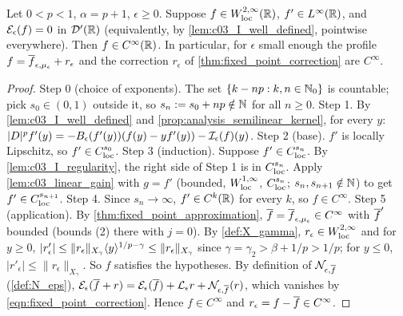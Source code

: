 \begin{theorem}
  \label{thm:fixed_point_smoothness}
  Let $0<p<1$, $\alpha=p+1$, $\epsilon\ge0$. Suppose $f\in W^{2,\infty}_{\textup{loc}}(\mathbb{R})$, $f'\in L^\infty(\mathbb{R})$, and $\mathcal{E}_\epsilon(f)=0$ in $\mathcal{D}'(\mathbb{R})$
  (equivalently, by \cref{lem:c03_I_well_defined}, pointwise everywhere). Then $f\in C^\infty(\mathbb{R})$.
  In particular, for $\epsilon$ small enough the profile $f=\overline{f}_{\epsilon,\mu_\epsilon}+r_\epsilon$ and the correction $r_\epsilon$ of \cref{thm:fixed_point_correction} are $C^\infty$.
\end{theorem}
\begin{proof}
  Step 0 (choice of exponents). The set $\{k-np:k,n\in\mathbb{N}_0\}$ is countable; pick $s_0\in(0,1)$ outside it, so $s_n:=s_0+np\notin\mathbb{N}$ for all $n\ge0$.
  Step 1. By \cref{lem:c03_I_well_defined} and \cref{prop:analysis_semilinear_kernel}, for every $y$:
  $|D|^pf'(y)=-B_\epsilon(f'(y))(f(y)-yf'(y))-\mathcal{I}_\epsilon(f)(y)$.
  Step 2 (base). $f'$ is locally Lipschitz, so $f'\in C^{s_0}_{\textup{loc}}$.
  Step 3 (induction). Suppose $f'\in C^{s_n}_{\textup{loc}}$. By \cref{lem:c03_I_regularity}, the right side of Step 1 is in $C^{s_n}_{\textup{loc}}$. Apply \cref{lem:c03_linear_gain} with $g=f'$ (bounded, $W^{1,\infty}_{\textup{loc}}$, $C^{s_n}_{\textup{loc}}$; $s_n,s_{n+1}\notin\mathbb{N}$) to get $f'\in C^{s_{n+1}}_{\textup{loc}}$.
  Step 4. Since $s_n\to\infty$, $f'\in C^k(\mathbb{R})$ for every $k$, so $f\in C^\infty$.
  Step 5 (application). By \cref{thm:fixed_point_approximation}, $\overline{f}=\overline{f}_{\epsilon,\mu_\epsilon}\in C^\infty$ with $\overline{f}'$ bounded (bounds (2) there with $j=0$). By \cref{def:X_gamma}, $r_\epsilon\in W^{2,\infty}_{\textup{loc}}$ and for $y\ge0$, $|r_\epsilon'|\le\|r_\epsilon\|_{X_\gamma}\langle y \rangle^{1/p-\gamma}\le\|r_\epsilon\|_{X_\gamma}$ since $\gamma=\gamma_2>\beta+1/p>1/p$; for $y\le0$, $|r'_\epsilon|\le\|r_\epsilon\|_{X_\gamma}$. So $f$ satisfies the hypotheses.
  By definition of $\mathcal{N}_{\epsilon,\overline{f}}$ (\cref{def:N_eps}), $\mathcal{E}_\epsilon(\overline{f}+r)=\mathcal{E}_\epsilon(\overline{f})+\mathcal{L}_\epsilon r+\mathcal{N}_{\epsilon,\overline{f}}(r)$, which vanishes by \eqref{eqn:fixed_point_correction}. Hence $f\in C^\infty$ and $r_\epsilon=f-\overline{f}\in C^\infty$.
\end{proof}

